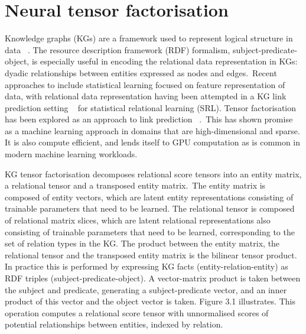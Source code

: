 \chapter{Neural tensor factorisation}


\ifpdf
     \graphicspath{{Figs/Chapter3/}}
\else
    \graphicspath{{Chapter3/Figs/Vector/}{Chapter3/Figs/}}
\fi

Knowledge graphs (KGs) are a framework used to represent logical structure in data \unskip ~\citep{koller2007introduction}. The resource description framework (RDF) formalism, subject-predicate-object, is especially useful in encoding the relational data representation in KGs: dyadic relationships between entities expressed as nodes and edges.\ Recent approaches to include statistical learning focused on feature representation of data, with relational data representation having been attempted in a KG link prediction setting \unskip~\citep{kazemi2018simple, chang2014typed, kang2012gigatensor} for statistical relational learning (SRL). Tensor factorisation has been explored as an approach to link prediction \unskip ~\citep{nickel2011three, bordes2013translating, trouillon2016complex}.\ This has shown promise as a machine learning approach in domains that are high-dimensional and sparse. It is also compute efficient, and lends itself to GPU computation as is common in modern machine learning workloads. \par

\noindent KG tensor factorisation decomposes relational score tensors into an entity matrix, a relational tensor and a transposed entity matrix.\ The entity matrix is composed of entity vectors, which are latent entity representations consisting of trainable parameters that need to be learned. The relational tensor is composed of relational matrix slices, which are latent relational representations also consisting of trainable parameters that need to be learned, corresponding to the set of relation types in the KG. The product between the entity matrix, the relational tensor and the transposed entity matrix is the bilinear tensor product. In practice this is performed by expressing KG facts (entity-relation-entity) as RDF triples (subject-predicate-object). A vector-matrix product is taken between the subject and predicate, generating a subject-predicate vector, and an inner product of this vector and the object vector is taken. Figure 3.1 illustrates. This operation computes a relational score tensor with unnormalised scores of potential relationships between entities, indexed by relation. \par

